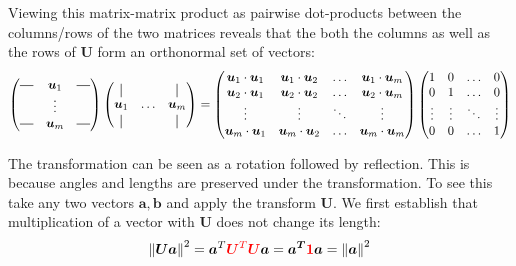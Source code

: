 Viewing this matrix-matrix product as pairwise dot-products between the columns/rows of the two matrices
reveals that the both the columns as well as the rows of $\bm{U}$ form an orthonormal set of vectors:
\begin{align}
    \begin{pmatrix}
        \horzbar & \bm{u}_1 & \horzbar \\
                  & \vdots   &  \\
        \horzbar & \bm{u}_m &  \horzbar \\
    \end{pmatrix} 
    \begin{pmatrix}
    \vertbar &        & \vertbar \\
    \bm{u}_1 & \hdots & \bm{u}_m \\
    \vertbar &        & \vertbar 
    \end{pmatrix} = 
    \begin{pmatrix}
        \bm{u}_{1} \cdot \bm{u}_{1} & \bm{u}_{1} \cdot \bm{u}_{2} & \hdots & \bm{u}_{1} \cdot \bm{u}_{m} \\
        \bm{u}_{2} \cdot \bm{u}_{1} & \bm{u}_{2} \cdot \bm{u}_{2} & \hdots & \bm{u}_{2} \cdot \bm{u}_{m} \\
        \vdots                    & \vdots                        & \ddots & \vdots                      \\
        \bm{u}_{m} \cdot \bm{u}_{1} & \bm{u}_{m} \cdot \bm{u}_{2} & \hdots & \bm{u}_{m} \cdot \bm{u}_{m} \\
    \end{pmatrix}   
    \begin{pmatrix}
        1 & 0 & \hdots & 0 \\
        0 & 1 & \hdots & 0 \\
        \vdots & \vdots & \ddots & \vdots \\
        0 & 0 & \hdots & 1
    \end{pmatrix}
\end{align}

The transformation can be seen as a rotation followed by reflection.
This is because angles and lengths are preserved under the transformation.
To see this take any two vectors $\bm{a}, \bm{b}$ and apply the transform $\bm{U}$.
We first establish that multiplication of a vector with $\bm{U}$ does not change its length:
\begin{align}
    \norm{\bm{Ua}}^2 = \bm{a}^T {\color{red} \bm{U}^T\bm{U}} \bm{a} =\bm{a^T} {\color{red} \bm{1}} \bm{a} = \norm{\bm{a}}^2
\end{align}

